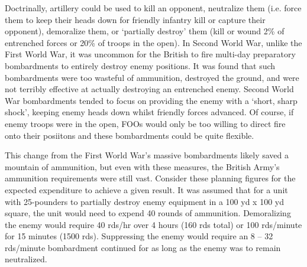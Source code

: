 \documentclass[noraggedright]{turabian-researchpaper}
\begin{document}
Doctrinally, artillery could be used to kill an opponent, neutralize them 
(i.e. force them to keep their heads down for 
friendly infantry kill or capture their opponent), demoralize them, or 
`partially destroy' them (kill or wound 2\% of entrenched forces or 20\% of 
troops in the open).\autocite[133]{gunfire}  In Second World War, unlike the 
First World War, it was uncommon for the 
British to fire multi-day preparatory bombardments to entirely destroy enemy 
positions.  It was found that such bombardments were too wasteful of 
ammunition, destroyed the ground, and were not terribly effective at actually 
destroying an entrenched enemy.\autocite[132]{gunfire} Second World War 
bombardments tended to focus on providing the enemy with a `short, sharp 
shock', keeping enemy heads down whilst friendly forces advanced.  Of course, 
if enemy troops were in the open, FOOs would only be too willing to direct 
fire onto their posiitons and these bombardments could be quite 
flexible.\autocite[133]{gunfire}


This change from the First World War's massive bombardments likely saved a 
mountain of ammunition, but even with these measures, the British Army's 
ammunition requirements were still vast.  Consider these planning figures for
the expected expenditure to achieve a given result.  It was 
assumed that for a unit with 25-pounders to partially destroy enemy equipment 
in a 100 yd x 100 yd square, the unit would need to expend 40 rounds of 
ammunition.  Demoralizing the enemy would require 40 rds/hr 
over 4 hours (160 rds total) or 100 rds/minute for 15 minutes (1500 rds).  
Suppressing the enemy would require an 8 -- 32 rds/minute bombardment 
continued for as long as the enemy was to remain neutralized.\autocite[133]
{gunfire}  
\end{document}
